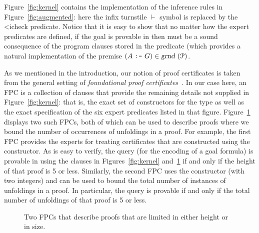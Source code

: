 Figure~\ref{fig:kernel} contains the \lP implementation of the
inference rules in Figure~\ref{fig:augmented}: here the infix
turnstile $\vdash$ symbol is replaced by the \lst<i{check} predicate.
%
Notice that it is easy to show that no matter how the expert predicates
are defined, if the goal  is provable in \lP then
 must be a sound consequence of the program clauses stored in
the  predicate (which provides a natural implementation of
the premise $(A~\hbox{\tt :-}~G)\in\hbox{\sl grnd}~({\mathcal P})$.

As we mentioned in the introduction, our notion of proof certificates
 is taken from the general setting of \emph{foundational
  proof certificates}~\cite{chihani17jar}.
%
In our case here, an FPC is a collection of \lP clauses that
provide the remaining details not supplied in Figure~\ref{fig:kernel}:
that is, the exact set of constructors for the  type as
well as the exact specification of the six expert predicates listed in
that figure.
%
Figure~\ref{fig:resources} displays two such FPCs,
both of which can be used to describe proofs where we bound
the number of occurrences of unfoldings in a proof.
%
For example, the first FPC
provides the experts for treating certificates that are constructed
using the  constructor.
%
As is easy to verify, the query \mbox{} (for the
encoding  of a goal formula) is provable in \lP using the
clauses in Figures~\ref{fig:kernel} and~\ref{fig:resources} if and
only if the height of that proof is 5 or less.
%
Similarly, the second FPC uses the constructor  (with two
integers) and can be used to bound the total number of instances of
unfoldings in a proof.
%
In particular, the query \mbox{}
is provable if and only if the total number of unfoldings of that
proof is 5 or less.


\begin{figure}


\caption{Two FPCs that describe proofs that are limited in either
  height or in size.}
\label{fig:resources}
\end{figure}

%

